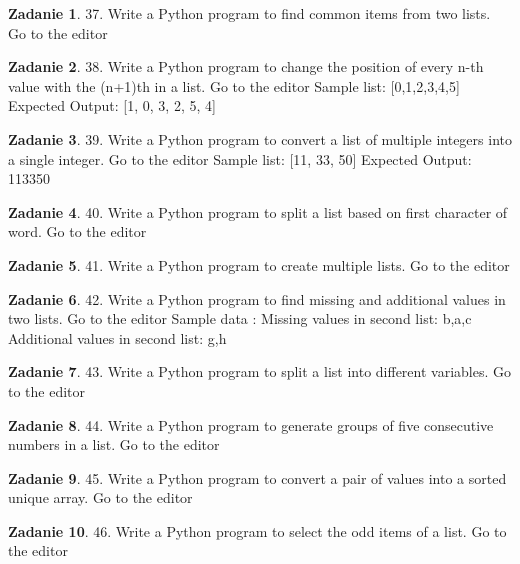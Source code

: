 \documentclass[11pt]{article}
\theoremstyle{definition}
\newtheorem{zadanie}{Zadanie}
\begin{document}
\begin{zadanie}
37. Write a Python program to find common items from two lists. Go to the editor
\end{zadanie}

\begin{zadanie}
38. Write a Python program to change the position of every n-th value with the (n+1)th in a list. Go to the editor
Sample list: [0,1,2,3,4,5]
Expected Output: [1, 0, 3, 2, 5, 4]
\end{zadanie}

\begin{zadanie}
39. Write a Python program to convert a list of multiple integers into a single integer. Go to the editor
Sample list: [11, 33, 50]
Expected Output: 113350
\end{zadanie}

\begin{zadanie}
40. Write a Python program to split a list based on first character of word. Go to the editor
\end{zadanie}

\begin{zadanie}
41. Write a Python program to create multiple lists. Go to the editor
\end{zadanie}

\begin{zadanie}
42. Write a Python program to find missing and additional values in two lists. Go to the editor
Sample data : Missing values in second list: b,a,c
Additional values in second list: g,h
\end{zadanie}

\begin{zadanie}
43. Write a Python program to split a list into different variables. Go to the editor
\end{zadanie}

\begin{zadanie}
44. Write a Python program to generate groups of five consecutive numbers in a list. Go to the editor
\end{zadanie}

\begin{zadanie}
45. Write a Python program to convert a pair of values into a sorted unique array. Go to the editor
\end{zadanie}

\begin{zadanie}
46. Write a Python program to select the odd items of a list. Go to the editor
\end{zadanie}
\end{document}

